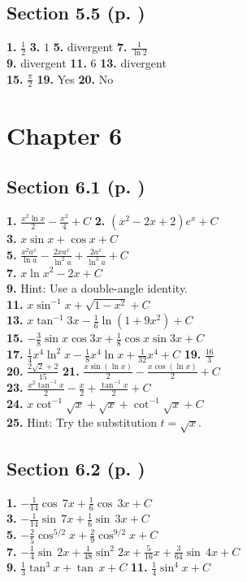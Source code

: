 \begin{multicols*}{2}
\subsection*{Section 5.5 (p. \pageref{sec5dot5})}
\textbf{1.} $\frac{1}{2}$ \quad
\textbf{3.} $1$ \quad
\textbf{5.} divergent \quad
\textbf{7.} $\frac{1}{\ln 2}$\\
\textbf{9.} divergent \quad
\textbf{11.} $6$ \quad
\textbf{13.} divergent\\
\textbf{15.} $\frac{\pi}{2}$ \quad
\textbf{19.} Yes \quad
\textbf{20.} No
\section*{Chapter 6}
\subsection*{Section 6.1 (p. \pageref{sec6dot1})}
\textbf{1.} $\frac{x^2 \ln x}{2} - \frac{x^2}{4} + C$ \quad
\textbf{2.} $(x^2 - 2x + 2)e^x + C$\\
\textbf{3.} $x \sin x + \cos x + C$\\
\textbf{5.} $\frac{x^2 a^x}{\ln a} - \frac{2x a^x}{\ln^2 a} + \frac{2 a^x}{\ln^3 a} + C$\\
\textbf{7.} $x \ln x^2 - 2x + C$\\
\textbf{9.} Hint: Use a double-angle identity.\\
\textbf{11.} $x \sin^{-1} x + \sqrt{1-x^2} + C$\\
\textbf{13.} $x \tan^{-1} 3x - \frac{1}{6}\ln (1+9x^2) + C$\\
\textbf{15.} $-\frac{3}{8}\sin x \cos 3x + \frac{1}{8}\cos x \sin 3x + C$\\
\textbf{17.} $\frac{1}{4}x^4 \ln^2 x - \frac{1}{8}x^4 \ln x + \frac{1}{32}x^4 + C$ \quad
\textbf{19.} $\frac{16}{3}$\\
\textbf{20.} $\frac{2\sqrt{2}+2}{15}$ \quad
\textbf{21.} $\frac{x \sin (\ln x)}{2} - \frac{x \cos (\ln x)}{2} + C$\\
\textbf{23.} $\frac{x^2 \tan^{-1} x}{2} - \frac{x}{2} + \frac{\tan^{-1} x}{2} + C$\\
\textbf{24.} $x \cot^{-1} \sqrt{x} + \sqrt{x} + \cot^{-1} \sqrt{x} + C$\\
\textbf{25.} Hint: Try the substitution $t=\sqrt{x}$.
\subsection*{Section 6.2 (p. \pageref{sec6dot2})}
\textbf{1.} $-\frac{1}{14}\cos\,7x + \frac{1}{6}\cos\,3x + C$\\
\textbf{3.} $-\frac{1}{14}\sin\,7x + \frac{1}{6}\sin\,3x + C$\\
\textbf{5.} $-\frac{2}{5}\cos^{5/2}x + \frac{2}{9}\cos^{9/2}x + C$\\
\textbf{7.} $-\frac{1}{4}\sin\,2x + \frac{1}{48}\sin^2 2x + \frac{5}{16}x + \frac{3}{64}\sin\,4x+ C$\\
\textbf{9.} $\frac{1}{3}\tan^3 x + \tan\,x + C$ \quad
\textbf{11.} $\frac{1}{4}\sin^4 x + C$

\end{multicols*}
